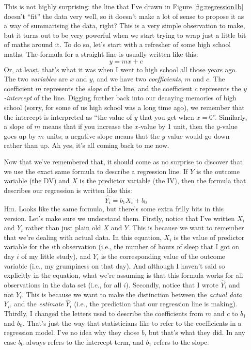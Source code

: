 \documentclass[
]{book}
\begin{document}
This is not highly surprising: the line that I've drawn in Figure \ref{fig:regression1b} doesn't ``fit'' the data very well, so it doesn't make a lot of sense to propose it as a way of summarising the data, right? This is a very simple observation to make, but it turns out to be very powerful when we start trying to wrap just a little bit of maths around it. To do so, let's start with a refresher of some high school maths. The formula for a straight line is usually written like this:
\[
y = mx + c
\]
Or, at least, that's what it was when I went to high school all those years ago. The two \emph{variables} are \(x\) and \(y\), and we have two \emph{coefficients}, \(m\) and \(c\). The coefficient \(m\) represents the \emph{slope} of the line, and the coefficient \(c\) represents the \emph{\(y\)-intercept} of the line. Digging further back into our decaying memories of high school (sorry, for some of us high school was a long time ago), we remember that the intercept is interpreted as ``the value of \(y\) that you get when \(x=0\)''. Similarly, a slope of \(m\) means that if you increase the \(x\)-value by 1 unit, then the \(y\)-value goes up by \(m\) units; a negative slope means that the \(y\)-value would go down rather than up. Ah yes, it's all coming back to me now.

Now that we've remembered that, it should come as no surprise to discover that we use the exact same formula to describe a regression line. If \(Y\) is the outcome variable (the DV) and \(X\) is the predictor variable (the IV), then the formula that describes our regression is written like this:
\[
\hat{Y_i} = b_1 X_i + b_0
\]
Hm. Looks like the same formula, but there's some extra frilly bits in this version. Let's make sure we understand them. Firstly, notice that I've written \(X_i\) and \(Y_i\) rather than just plain old \(X\) and \(Y\). This is because we want to remember that we're dealing with actual data. In this equation, \(X_i\) is the value of predictor variable for the \(i\)th observation (i.e., the number of hours of sleep that I got on day \(i\) of my little study), and \(Y_i\) is the corresponding value of the outcome variable (i.e., my grumpiness on that day). And although I haven't said so explicitly in the equation, what we're assuming is that this formula works for all observations in the data set (i.e., for all \(i\)). Secondly, notice that I wrote \(\hat{Y}_i\) and not \(Y_i\). This is because we want to make the distinction between the \emph{actual data} \(Y_i\), and the \emph{estimate} \(\hat{Y}_i\) (i.e., the prediction that our regression line is making). Thirdly, I changed the letters used to describe the coefficients from \(m\) and \(c\) to \(b_1\) and \(b_0\). That's just the way that statisticians like to refer to the coefficients in a regression model. I've no idea why they chose \(b\), but that's what they did. In any case \(b_0\) always refers to the intercept term, and \(b_1\) refers to the slope.
\end{document}
